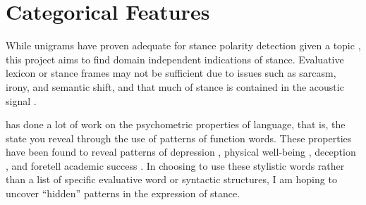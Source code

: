 \section{Categorical Features} 
\label{sec:cat_features} 

While unigrams have proven adequate for stance polarity detection given a topic \citep{somasundaran2010recognizing}, this project aims to find domain independent indications of stance.  Evaluative lexicon or stance frames may not be sufficient due to issues such as sarcasm, irony, and semantic shift, and that much of stance is contained in the acoustic signal \citep{freeman2015phonetics, freeman2015prosody}.  

  
\cite{pennebaker2001linguistic} has done a lot of work on the psychometric properties of language, that is, the state you reveal through the use of patterns of function words.  These properties have been found to reveal patterns of depression \citep{chung2007psychological}, physical well-being \citep{chung2007psychological}, deception \citep{newman2003lying}, and foretell academic success \citep{pennebaker2014small}.  In choosing to use these stylistic words rather than a list of specific evaluative word or syntactic structures, I am hoping to uncover ``hidden'' patterns in the expression of stance.  


%

